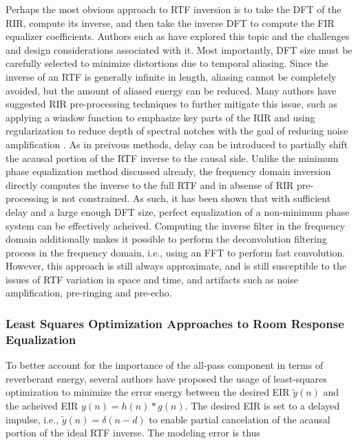Perhaps the most obvious approach to RTF inversion is to take the DFT of the RIR, compute its inverse, and then take the inverse DFT to compute the FIR equalizer coefficients. Authors such as \cite{kulp1988digital} have explored this topic and the challenges and design considerations associated with it. Most importantly, DFT size must be carefully selected to minimize distortions due to temporal aliasing. Since the inverse of an RTF is generally infinite in length, aliasing cannot be completely avoided, but the amount of aliased energy can be reduced. Many authors have suggested RIR pre-processing techniques to further mitigate this issue, such as applying a window function to emphasize key parts of the RIR \citep{kulp1988digital} and using regularization to reduce depth of spectral notches with the goal of reducing noise amplification \citep{bean1989loudspeaker, kirkeby1996fast}. As in preivous methods, delay can be introduced to partially shift the acausal portion of the RTF inverse to the causal side. Unlike the minimum phase equalization method discussed already, the frequency domain inversion directly computes the inverse to the full RTF and in absense of RIR pre-processing is not constrained. As such, it has been shown that with sufficient delay and a large enough DFT size, perfect equalization of a non-minimum phase system can be effectively acheived. Computing the inverse filter in the frequency domain additionally makes it possible to perform the deconvolution filtering process in the frequency domain, i.e., using an FFT to perform fast convolution. However, this approach is still always approximate, and is still susceptible to the issues of RTF variation in space and time, and artifacts such as noise amplification, pre-ringing and pre-echo.

\subsubsection{Least Squares Optimization Approaches to Room Response Equalization}

To better account for the importance of the all-pass component in terms of reverberant energy, several authors \citep[e.g., ][]{clarkson1985spectral} have proposed the usage of least-squares optimization to minimize the error energy between the desired EIR $\tilde{y}(n)$ and the acheived EIR $y(n)=h(n)*g(n)$.  The desired EIR is set to a delayed impulse, i.e., $\tilde{y}(n)=\delta(n-d)$ to enable partial cancelation of the acausal portion of the ideal RTF inverse. The modeling error is thus

